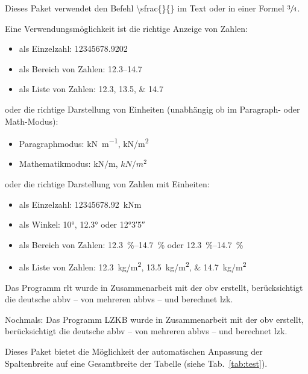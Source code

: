 %
Dieses Paket verwendet den Befehl \textbackslash{}sfrac\{\}\{\} im Text
 oder in einer Formel $\sfrac{3}{4}$.

Eine Verwendungsmöglichkeit ist die richtige Anzeige von Zahlen:
%
\begin{itemize} 
  \item als Einzelzahl: \num{12345678,9202}
  \item als Bereich von Zahlen: \numrange{12,3}{14,7} 
  \item als Liste von Zahlen: 
                      \numlist[list-final-separator={ und }]{12,3;13,5;14,7}
\end{itemize}
%
oder die richtige Darstellung von Einheiten (unabhängig ob im Paragraph- oder Math-Modus):
%
\begin{itemize} 
  \item Paragraphmodus: \si{\kilo\newton\per\meter}, \si{kN/m^2}
  \item Mathematikmodus:  $\si{\kilo\newton\per\meter}$, $\si{kN/m^2}$
\end{itemize}
%
oder die richtige Darstellung von Zahlen mit Einheiten:
%
\begin{itemize} 
  \item als Einzelzahl: \SI{12345678,92}{kNm}
  \item als Winkel: \ang{10}, \ang{12.3} oder \ang{12;3;5}
  \item als Bereich von Zahlen: \SIrange{12,3}{14,7}{\%} oder 
          \SIrange[range-units = single]{12,3}{14,7}{\%}
  \item als Liste von Zahlen: 
        \SIlist[list-final-separator={ und }]{12,3;13,5;14,7}{\kilogram/m^2}
\end{itemize}
%


Das Programm \ac{rlt} wurde in Zusammenarbeit mit der \ac{obv} erstellt, berücksichtigt die deutsche \ac{abbv} -- von mehreren \aclp{abbv} -- und berechnet \ac{lzk}.

Nochmals:
Das Programm LZKB wurde in Zusammenarbeit mit der \ac{obv} erstellt, berücksichtigt die deutsche \ac{abbv} -- von mehreren \acp{abbv} -- und berechnet \ac{lzk}.

\printacronyms[name=Abkürzungen]



Dieses Paket bietet die Möglichkeit der automatischen Anpassung der Spaltenbreite auf eine Gesamtbreite der Tabelle (siehe Tab.~\ref{tab:test}).


